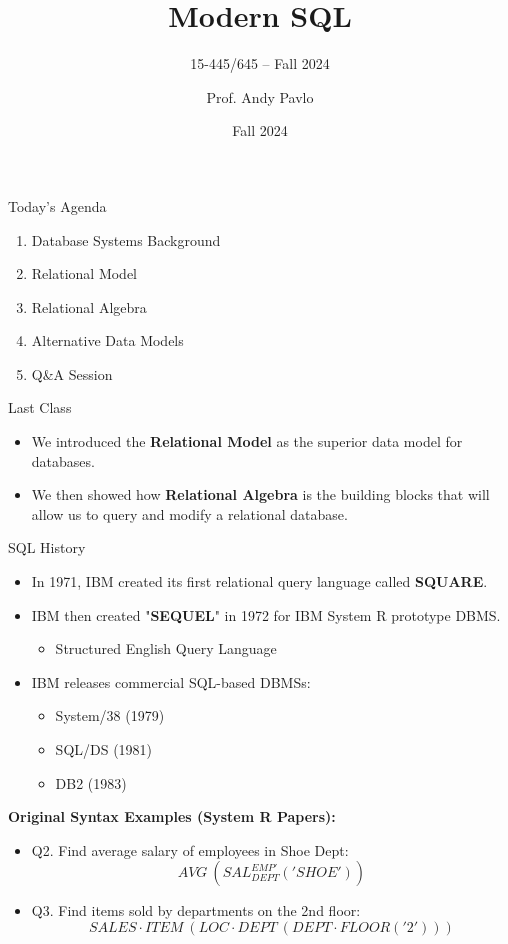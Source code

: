 \documentclass[aspectratio=169]{beamer}
\title{Modern SQL}
\subtitle{15-445/645 -- Fall 2024}
\author{Prof. Andy Pavlo}
\institute{Carnegie Mellon University}
\date{Fall 2024}
\begin{document}
\frame{\titlepage}

\begin{frame}{Today's Agenda}
    \begin{enumerate}
        \item Database Systems Background
        \item Relational Model
        \item Relational Algebra
        \item Alternative Data Models
        \item Q\&A Session
    \end{enumerate}
\end{frame}

\begin{frame}{Last Class}
    \begin{itemize}
        \item We introduced the \textbf{Relational Model} as the superior data model for databases.
        \item We then showed how \textbf{Relational Algebra} is the building blocks that will allow us to query and modify a relational database.
    \end{itemize}
\end{frame}

\begin{frame}{SQL History}
    \begin{itemize}
        \item In 1971, IBM created its first relational query language called \textbf{SQUARE}.
        \item IBM then created "\textbf{SEQUEL}" in 1972 for IBM System R prototype DBMS.
        \begin{itemize}
            \item Structured English Query Language
        \end{itemize}
        \item IBM releases commercial SQL-based DBMSs:
        \begin{itemize}
            \item System/38 (1979)
            \item SQL/DS (1981)
            \item DB2 (1983)
        \end{itemize}
    \end{itemize}
    \vspace{0.5cm}
    \textbf{Original Syntax Examples (System R Papers):}
    \begin{itemize}
        \item Q2. Find average salary of employees in Shoe Dept:
        \[ AVG \: ({SAL}^{EMP'}_{DEPT}('SHOE')) \]
        \item Q3. Find items sold by departments on the 2nd floor:
        \[ SALES \cdot ITEM \: (LOC \cdot DEPT \: (DEPT \cdot FLOOR ('2'))) \]
    \end{itemize}
\end{frame}
\end{document}
